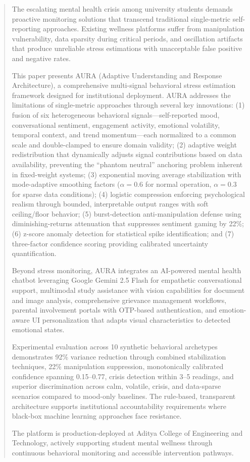 \documentclass[journal]{IEEEtran}
\begin{document}
\begin{abstract}
The escalating mental health crisis among university students demands proactive monitoring solutions that transcend traditional single-metric self-reporting approaches. Existing wellness platforms suffer from manipulation vulnerability, data sparsity during critical periods, and oscillation artifacts that produce unreliable stress estimations with unacceptable false positive and negative rates.

This paper presents AURA (Adaptive Understanding and Response Architecture), a comprehensive multi-signal behavioral stress estimation framework designed for institutional deployment. AURA addresses the limitations of single-metric approaches through several key innovations: (1) fusion of six heterogeneous behavioral signals---self-reported mood, conversational sentiment, engagement activity, emotional volatility, temporal context, and trend momentum---each normalized to a common scale and double-clamped to ensure domain validity; (2) adaptive weight redistribution that dynamically adjusts signal contributions based on data availability, preventing the ``phantom neutral'' anchoring problem inherent in fixed-weight systems; (3) exponential moving average stabilization with mode-adaptive smoothing factors ($\alpha=0.6$ for normal operation, $\alpha=0.3$ for sparse data conditions); (4) logistic compression enforcing psychological realism through bounded, interpretable output ranges with soft ceiling/floor behavior; (5) burst-detection anti-manipulation defense using diminishing-returns attenuation that suppresses sentiment gaming by 22\%; (6) z-score anomaly detection for statistical spike identification; and (7) three-factor confidence scoring providing calibrated uncertainty quantification.

Beyond stress monitoring, AURA integrates an AI-powered mental health chatbot leveraging Google Gemini 2.5 Flash for empathetic conversational support, multimodal study assistance with vision capabilities for document and image analysis, comprehensive grievance management workflows, parental involvement portals with OTP-based authentication, and emotion-aware UI personalization that adapts visual characteristics to detected emotional states.

Experimental evaluation across 10 synthetic behavioral archetypes demonstrates 92\% variance reduction through combined stabilization techniques, 22\% manipulation suppression, monotonically calibrated confidence spanning 0.15--0.77, crisis detection within 3--5 readings, and superior discrimination across calm, volatile, crisis, and data-sparse scenarios compared to mood-only baselines. The rule-based, transparent architecture supports institutional accountability requirements where black-box machine learning approaches face resistance.

The platform is production-deployed at Aditya College of Engineering and Technology, actively supporting student mental wellness through continuous behavioral monitoring and accessible intervention pathways.
\end{abstract}
\end{document}

